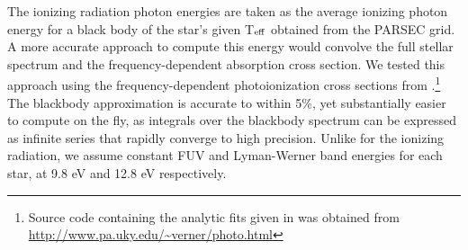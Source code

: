 \documentclass[fleqn,usenatbib,useAMS]{mnras}
\begin{document}
The ionizing radiation photon energies are taken as the average ionizing photon energy for a black body of the star's given T$_{\rm eff}$ obtained from the PARSEC grid. A more accurate approach to compute this energy would convolve the full stellar spectrum and the frequency-dependent absorption cross section. We tested this approach using the frequency-dependent photoionization cross sections from \citet{1996ApJ...465..487V}.\footnote{Source code containing the analytic fits given in \citet{1996ApJ...465..487V} was obtained from \url{http://www.pa.uky.edu/~verner/photo.html}} 
The blackbody approximation is accurate to within 5\%, yet substantially easier to compute on the fly, as integrals over the blackbody spectrum can be expressed as infinite series that rapidly converge to high precision. Unlike for the ionizing radiation, we assume constant FUV and Lyman-Werner band energies for each star, at 9.8 eV and 12.8 eV respectively.
\end{document}
